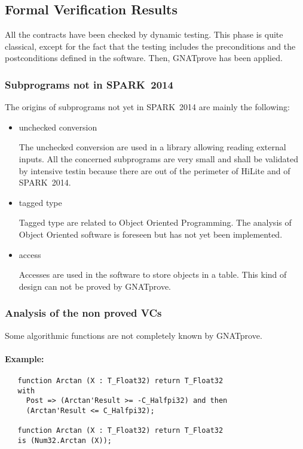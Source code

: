 \documentclass[10pt,a4paper,twocolumn]{article}
\newcommand{\gnatprove}{GNATprove\xspace}
\newcommand{\newspark}{SPARK~2014\xspace}
\begin{document}
\subsection{Formal Verification Results}

All the contracts have been checked by dynamic testing. This phase is quite classical, except for the fact that the testing includes the preconditions and the postconditions defined in the software. Then, \gnatprove has been applied.

\ifdefined\abstractonly
\else
\subsubsection{Subprograms not in \newspark}

The origins of subprograms not yet in \newspark are mainly the following:

\begin{itemize}
\item unchecked conversion

The unchecked conversion are used in a library allowing reading external inputs.
All the concerned subprograms are very small and shall be validated by intensive testin because there are out of the perimeter of HiLite and of \newspark.
\item tagged type

Tagged type are related to Object Oriented Programming. The analysis of Object Oriented software is foreseen but has not yet been implemented.
\item access

Accesses are used in the software to store objects in a table.
This kind of design can not be proved by \gnatprove.
\end{itemize}

\subsubsection{Analysis of the non proved VCs}

Some algorithmic functions are not completely known by \gnatprove.

\paragraph{Example:}

\begin{verbatim}
   function Arctan (X : T_Float32) return T_Float32
   with
     Post => (Arctan'Result >= -C_Halfpi32) and then
     (Arctan'Result <= C_Halfpi32);

   function Arctan (X : T_Float32) return T_Float32
   is (Num32.Arctan (X));
\end{verbatim}
\end{document}
